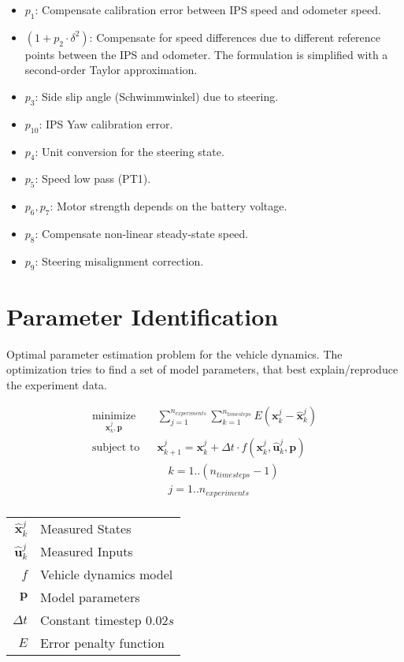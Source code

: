 \documentclass[12pt]{article}
\begin{document}
\begin{itemize}
\item $p_1$: Compensate calibration error between IPS speed and odometer speed. 
\item $(1+p_2 \cdot \delta^2)$: Compensate for speed differences due to different reference points between the IPS and odometer. The formulation is simplified with a second-order Taylor approximation.
\item $p_3$: Side slip angle (Schwimmwinkel) due to steering.
\item $p_{10}$: IPS Yaw calibration error.
\item $p_{4}$: Unit conversion for the steering state.
\item $p_{5}$: Speed low pass (PT1).
\item $p_{6}, p_{7}$: Motor strength depends on the battery voltage.
\item $p_{8}$: Compensate non-linear steady-state speed.
\item $p_{9}$: Steering misalignment correction.
\end{itemize}


\section{Parameter Identification}

Optimal parameter estimation problem for the vehicle dynamics. The optimization tries to find a set of model parameters, that best explain/reproduce the experiment data.

\begin{align*}
\underset{\boldsymbol{x}_k^j, \boldsymbol{p}}{\text{minimize}} && \sum_{j=1}^{n_{experiments}} \sum_{k=1}^{n_{timesteps}} E(\boldsymbol{x}_k^j - \hat{\boldsymbol{x}}_k^j) \\
\text{subject to} &&  \boldsymbol{x}_{k+1}^j = \boldsymbol{x}_k^j + \Delta t \cdot f(\boldsymbol{x}_k^j,  \hat{\boldsymbol{u}}_k^j, \boldsymbol{p}) \\
&& \quad k=1..(n_{timesteps}-1) \\
&& \quad j=1..n_{experiments} \\
\end{align*} 



\begin{center}
\begin{tabular}{ r | l }
 $\hat{\boldsymbol{x}}_k^j$ & Measured States  \\ 
 $\hat{\boldsymbol{u}}_k^j$ & Measured Inputs   \\ 
 $f$ & Vehicle dynamics model  \\ 
 $\boldsymbol{p}$ & Model parameters  \\ 
 $\Delta t$ & Constant timestep $0.02s$ \\ 
 $E$ & Error penalty function \\ 
\end{tabular}
\end{center}
\end{document}
